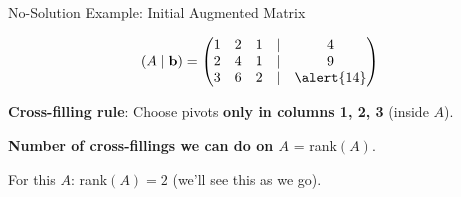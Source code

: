 \documentclass[10pt]{beamer}
\theoremstyle{definition}
\newcommand{\x}[1]{\alert{\textbf{#1}}}
\begin{document}
\begin{frame}[fragile]{No-Solution Example: Initial Augmented Matrix}

$$(A \mid \mathbf{b}) = \begin{pmatrix}
1 & 2 & 1 & | & 4 \\
2 & 4 & 1 & | & 9 \\
3 & 6 & 2 & | & \alert{14}
\end{pmatrix}$$

\vspace{1em}

\x{Cross-filling rule}: Choose pivots \textbf{only in columns 1, 2, 3} (inside $A$).

\vspace{1em}

\x{Number of cross-fillings we can do on $A$} = rank$(A)$.

\vspace{0.5em}

For this $A$: rank$(A) = 2$ (we'll see this as we go).

\end{frame}
\end{document}
